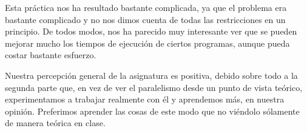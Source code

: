 Esta práctica nos ha resultado bastante complicada, ya que el problema era bastante complicado y no nos dimos cuenta de todas las restricciones en un principio. De todos modos, nos ha parecido muy interesante ver que se pueden mejorar mucho los tiempos de ejecución de ciertos programas, aunque pueda costar bastante esfuerzo.


Nuestra percepción general de la asignatura es positiva, debido sobre todo a la segunda parte que, en vez de ver el paralelismo desde un punto de vista teórico, experimentamos a trabajar realmente con él y aprendemos más, en nuestra opinión. Preferimos aprender las cosas de este modo que no viéndolo sólamente de manera teórica en clase.

